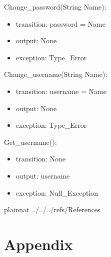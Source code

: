 \documentclass[12pt, titlepage]{article}
\begin{document}
\noindent Change\_password(String Name):
\begin{itemize}
\item transition: password = Name
\item output: None
\item exception: Type\_Error 
\end{itemize}

\noindent Change\_username(String Name):
\begin{itemize}
\item transition: username = Name
\item output: None
\item exception: Type\_Error 
\end{itemize}

\noindent Get\_username():
\begin{itemize}
\item transition: None
\item output: username
\item exception: Null\_Exception 
\end{itemize}

\newpage




 {plainnat}
 {../../../refs/References}

\section{Appendix} \label{Appendix}
\end{document}
